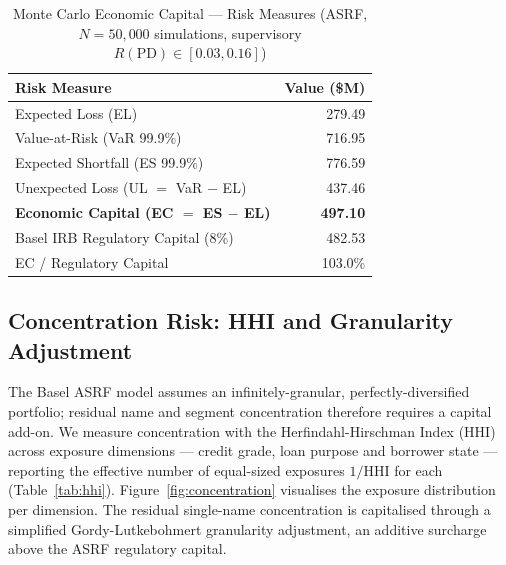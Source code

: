 \documentclass[11pt,a4paper]{article}
\begin{document}
\begin{table}[H]
\centering
\caption{Monte Carlo Economic Capital --- Risk Measures (ASRF, $N=50,000$ simulations, supervisory $R(\mathrm{PD}) \in [0.03, 0.16]$)}
\label{tab:risk_measures}
\vspace{0.5em}
\begin{tabular}{lr}
\toprule
\textbf{Risk Measure} & \textbf{Value (\$M)} \\
\midrule
Expected Loss (EL) & 279.49 \\
Value-at-Risk (VaR 99.9\%) & 716.95 \\
Expected Shortfall (ES 99.9\%) & 776.59 \\
Unexpected Loss (UL $=$ VaR $-$ EL) & 437.46 \\
\midrule
\textbf{Economic Capital (EC $=$ ES $-$ EL)} & \textbf{497.10} \\
Basel IRB Regulatory Capital (8\%) & 482.53 \\
EC / Regulatory Capital & 103.0\% \\
\bottomrule
\end{tabular}
\end{table}

\subsection{Concentration Risk: HHI and Granularity Adjustment}
The Basel ASRF model assumes an infinitely-granular, perfectly-diversified portfolio; residual name and segment concentration therefore requires a capital add-on. We measure concentration with the Herfindahl-Hirschman Index (HHI) across exposure dimensions --- credit grade, loan purpose and borrower state --- reporting the effective number of equal-sized exposures $1/\text{HHI}$ for each (Table~\ref{tab:hhi}). Figure~\ref{fig:concentration} visualises the exposure distribution per dimension. The residual single-name concentration is capitalised through a simplified Gordy-Lutkebohmert granularity adjustment, an additive surcharge above the ASRF regulatory capital.
\end{document}
